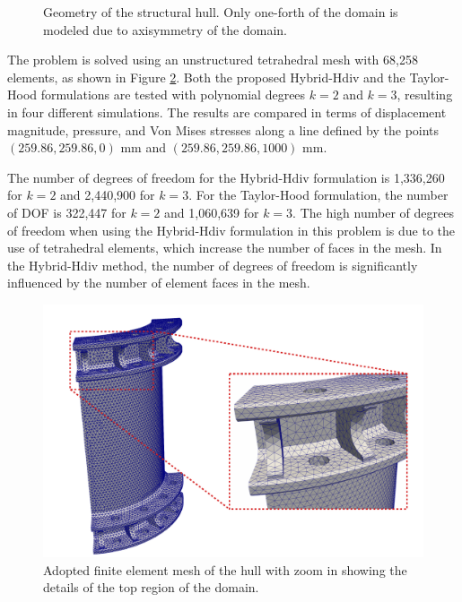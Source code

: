 \documentclass[english,11pt,3p,number,sort&compress]{elsarticle}
\begin{document}
\begin{figure}[h]
    \centering
    \def\svgwidth{450pt} 
    
    \caption{Geometry of the structural hull. Only one-forth of the domain is modeled due to axisymmetry of the domain.}
    \label{fig:module-geometry}
\end{figure}

The problem is solved using an unstructured tetrahedral mesh with 68,258 elements, as shown in Figure \ref{fig:module-mesh}. Both the proposed Hybrid-Hdiv and the Taylor-Hood formulations are tested with polynomial degrees $k=2$ and $k=3$, resulting in four different simulations. The results are compared in terms of displacement magnitude, pressure, and Von Mises stresses along a line defined by the points $(259.86, 259.86, 0)$ mm and $(259.86, 259.86, 1000)$ mm. 

The number of degrees of freedom  for the Hybrid-Hdiv formulation is 1,336,260 for $k=2$ and 2,440,900 for $k=3$. For the Taylor-Hood formulation, the number of DOF is 322,447 for $k=2$ and 1,060,639 for $k=3$. The high number of degrees of freedom when using the Hybrid-Hdiv formulation in this problem is due to the use of tetrahedral elements, which increase the number of faces in the mesh. In the Hybrid-Hdiv method, the number of degrees of freedom is significantly influenced by the number of element faces in the mesh.

\begin{figure}[h]
	\centering
	\includegraphics[scale=0.75]{hull-mesh.pdf}
	\caption{Adopted finite element mesh of the hull with zoom in showing the details of the top region of the domain.}
	\label{fig:module-mesh}
\end{figure}
\end{document}

